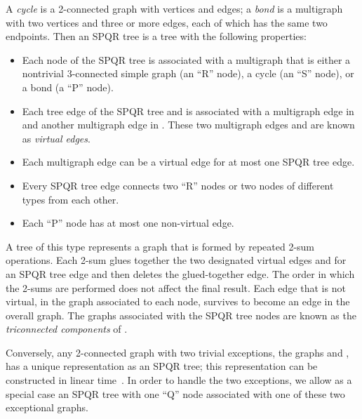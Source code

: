 \documentclass[runningheads]{llncs}
\begin{document}
A \emph{cycle} is a 2-connected graph with  vertices and  edges; a \emph{bond} is a multigraph with two vertices and three or more edges, each of which has the same two endpoints.
Then an SPQR tree is a tree with the following properties:
\begin{itemize}
\item Each node  of the SPQR tree is associated with a multigraph  that is either a nontrivial 3-connected simple graph (an ``R'' node), a cycle (an ``S'' node), or a bond (a ``P'' node).
\item Each tree edge  of the SPQR tree and is associated with a multigraph edge  in  and another multigraph edge  in . These two multigraph edges  and  are known as \emph{virtual edges}. 
\item Each multigraph edge can be a virtual edge for at most one SPQR tree edge.
\item Every SPQR tree edge connects two ``R'' nodes or two nodes of different types from each other.
\item Each ``P'' node has at most one non-virtual edge.
\end{itemize}
A tree of this type represents a graph  that is formed by repeated 2-sum operations. Each 2-sum glues together the two designated virtual edges  and  for an SPQR tree edge and then deletes the glued-together edge. The order in which the 2-sums are performed does not affect the final result. Each edge that is not virtual, in the graph associated to each node, survives to become an edge in the overall graph. The graphs associated with the SPQR tree nodes are known as the \emph{triconnected components} of .

Conversely, any 2-connected graph with two trivial exceptions, the graphs  and , has a unique representation as an SPQR tree; this representation can be constructed in linear time~\cite{dt-ipt-89,ht-dgtc-73}. In order to handle the two exceptions, we allow as a special case an SPQR tree with one ``Q'' node associated with one of these two exceptional graphs.
\end{document}
